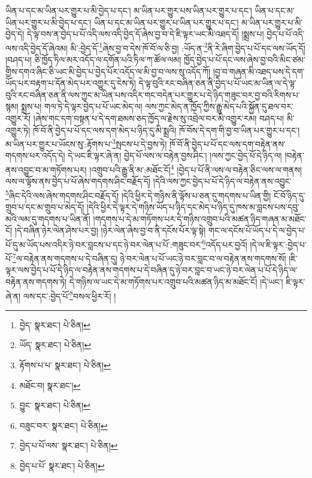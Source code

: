 ཡིན་པ་དང་མ་ཡིན་པར་གྱུར་པ་མི་བྱེད་པ་དང་། མ་ཡིན་པར་གྱུར་པས་ཡིན་པར་གྱུར་པ་དང་། ཡིན་པ་དང་མ་ཡིན་པར་གྱུར་པ་མི་བྱེད་པ་དང་། ཡིན་པ་དང་མ་ཡིན་པར་གྱུར་པ་ཡིན་པར་གྱུར་པ་དང་། མ་ཡིན་པར་གྱུར་པ་མི་བྱེད་དེ། དེ་ལྟ་བས་ན་བྱེད་པ་པོ་འདི་ལས་འདི་བྱེད་དོ་ཞེས་བྱ་བ་དེ་ཇི་ལྟར་ཡང་མི་འཐད་དོ། །སྨྲས་པ། བྱེད་པ་པོ་འདི་ལས་འདི་བྱེད་དོ་ཞེའམ། མི་:བྱེད་དོ་\footnote{བྱེད་  སྣར་ཐང་།  པེ་ཅིན། }ཞེས་བྱ་བ་དེས་ཁོ་བོ་ལ་ཅི་བྱ། :ཡོད་ན་\footnote{ཡོད་  སྣར་ཐང་།  པེ་ཅིན། }ནི་རེ་ཞིག་བྱེད་པ་པོ་དང་ལས་ཡོད་དོ། །བཤད་པ། ཅི་ཁྱོད་ཏིལ་མར་འདོད་ལ་དགོན་པའི་ཏིལ་ཀ་ཚོལ་ལམ། ཁྱོད་བྱེད་པ་པོ་དང་ལས་ཞེས་བྱ་བའི་མིང་ཙམ་གྱིས་དགའ་ཞིང་ཅི་ཡང་མི་བྱེད་པ་བྱེད་པོར་འདོད་ལ་མི་བྱ་བ་ལས་སུ་འདོད་ཀོ། །བྱ་བ་གཞན་མི་འཐད་པས་དེ་དག་ཡོད་པར་བརྟག་པ་དོན་མེད་པར་འགྱུར་དུ་ངེས་ཏེ། དེ་ལྟ་བུའི་རང་བཞིན་ཅན་ནི་བྱེད་པ་པོ་ཡང་མ་ཡིན་ལ་དེ་ལྟ་བུའི་རང་བཞིན་ཅན་ནི་ལས་ཀྱང་མ་ཡིན་པས་འདིར་གང་བདེན་པར་གྱུར་པ་དེ་ཉིད་གཟུང་བར་བྱ་བའི་རིགས་པ་སྙམ། སྨྲས་པ། གལ་ཏེ་དེ་ལྟར་བྱེད་པ་པོ་ཡང་མེད་ལ། ལས་ཀྱང་མེད་ན་ཁྱོད་ཀྱིས་རྒྱུ་མེད་པའི་སྐྱོན་དུ་ཐལ་བར་འགྱུར་རོ། །ཞེས་གང་དག་བསྟན་པ་དེ་དག་ཐམས་ཅད་ཁྱོད་ལ་རྗེས་སུ་འབྲེལ་བར་མི་འགྱུར་རམ། བཤད་པ། མི་འགྱུར་ཏེ། ཁོ་བོ་ནི་བྱེད་པ་པོ་དང་ལས་དག་མེད་པ་ཉིད་དུ་མི་སྨྲའི། ཁོ་བོས་དེ་དག་གི་བྱ་བ་ཡིན་པར་གྱུར་པ་དང་། མ་ཡིན་པར་གྱུར་པ་ཡོངས་སུ་:རྟོགས་པ་\footnote{རྟོགས་པ་པ་  སྣར་ཐང་།  པེ་ཅིན། }སྤངས་པ་དེ་བྱས་ཏེ། ཁོ་བོ་ནི་བྱེད་པ་པོ་དང་ལས་དག་བརྟེན་ནས་གདགས་པར་འདོད་དེ། དེ་ཡང་ཇི་ལྟར་ཞེ་ན། བྱེད་པོ་ལས་ལ་བརྟེན་བྱས་ཤིང་། །ལས་ཀྱང་བྱེད་པོ་དེ་ཉིད་ལ། །བརྟེན་ནས་འབྱུང་བ་མ་གཏོགས་པར། །འགྲུབ་པའི་རྒྱུ་ནི་མ་:མཐོང་ངོ།\footnote{མཐོང་བ།  སྣར་ཐང་། } །བྱེད་པ་པོ་ནི་ལས་ལ་བརྟེན་ཅིང་ལས་ལ་གནས། ལས་ལ་ལྟོས་ནས་བྱེད་པ་པོ་ཞེས་གདགས་ཤིང་བརྗོད་དོ། །དེའི་ལས་ཀྱང་བྱེད་པ་པོ་དེ་ཉིད་ལ་བརྟེན་ནས་འབྱུང་\footnote{བྱུང་  སྣར་ཐང་།  པེ་ཅིན། }ཞིང་དེའི་ལས་ཞེས་གདགས་ཤིང་བརྗོད་དོ། །དེའི་ཕྱིར་དེ་གཉིས་ནི་ལྟོས་པ་ཅན་དུ་གདགས་པ་ཡིན་གྱི། ངོ་བོ་ཉིད་དུ་གྲུབ་པ་དང་མ་གྲུབ་པ་མེད་དོ། །དེའི་ཕྱིར་དེ་ལྟར་དེ་གཉིས་ཡོད་པ་ཉིད་དང་མེད་པ་ཉིད་དུ་ཁས་མ་བླངས་པས་དབུ་མའི་ལམ་དུ་གདགས་པ་ཡིན་ནོ། །གདགས་པ་དེ་མ་གཏོགས་པར་དེ་གཉིས་འགྲུབ་པའི་མཚན་ཉིད་གཞན་མ་མཐོང་ངོ། །དེ་བཞིན་ཉེར་ལེན་ཤེས་པར་བྱ། །ཉེར་ལེན་ཞེས་བྱ་བ་ནི་དངོས་པོར་ལྟ་སྟེ། གང་ལ་དངོས་པོ་ཡོད་པ་དེ་ལ་བྱེད་པ་པོ་དུ་མ་ཡོད་པས་འདིར་ཉེ་བར་བླངས་པ་དང་ཉེ་བར་ལེན་པ་པོ་:གཟུང་བར་\footnote{བཟུང་བར་  སྣར་ཐང་།  པེ་ཅིན། }འདོད་པར་བྱའོ། །དེ་ལ་ཇི་ལྟར་:བྱེད་པ་པོ་\footnote{བྱེད་པ་པོ་ལས་  སྣར་ཐང་།  པེ་ཅིན། }ལ་བརྟེན་ནས་གདགས་པ་དེ་བཞིན་དུ། ཉེ་བར་ལེན་པ་པོ་ཡང་ཉེ་བར་བླང་བ་ལ་བརྟེན་ནས་གདགས་སོ། །ཇི་ལྟར་ལས་བྱེད་པ་པོ་དེ་ཉིད་ལ་བརྟེན་ནས་གདགས་པ་དེ་བཞིན་དུ་ཉེ་བར་བླང་བ་ཡང་ཉེ་བར་ལེན་པ་པོ་དེ་ཉིད་ལ་བརྟེན་ནས་གདགས་ཏེ། དེ་གཉིས་ལ་ཡང་དེ་མ་གཏོགས་པར་འགྲུབ་པའི་མཚན་ཉིད་མ་མཐོང་ངོ། །དེ་ཡང་། ཇི་ལྟར་ཞེ་ན། ལས་དང་:བྱེད་པོ་\footnote{བྱེད་པ་པོ་  སྣར་ཐང་།  པེ་ཅིན། }བསལ་ཕྱིར་རོ། །
